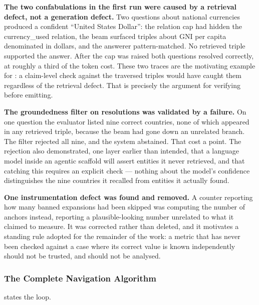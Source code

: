 \textbf{The two confabulations in the first run were caused by a retrieval
defect, not a generation defect.} Two questions about national currencies
produced a confident ``United States Dollar'': the relation cap had hidden the
\textsf{currency\_used} relation, the beam surfaced triples about GNI per capita
denominated in dollars, and the answerer pattern-matched. No retrieved triple
supported the answer. After the cap was raised both questions resolved
correctly, at roughly a third of the token cost. These two traces are the
motivating example for : a claim-level check
against the traversed triples would have caught them regardless of the retrieval
defect. That is precisely the argument for verifying before emitting.

\textbf{The groundedness filter on resolutions was validated by a failure.} On
one question the evaluator listed nine correct countries, none of which appeared
in any retrieved triple, because the beam had gone down an unrelated branch. The
filter rejected all nine, and the system abstained. That cost a point. The
rejection also demonstrated, one layer earlier than intended, that a language
model inside an agentic scaffold will assert entities it never retrieved, and
that catching this requires an explicit check --- nothing about the model's
confidence distinguishes the nine countries it recalled from entities it
actually found.

\textbf{One instrumentation defect was found and removed.} A counter reporting
how many banned expansions had been skipped was computing the number of anchors
instead, reporting a plausible-looking number unrelated to what it claimed to
measure. It was corrected rather than deleted, and it motivates a standing rule
adopted for the remainder of the work: a metric that has never been checked
against a case where its correct value is known independently should not be
trusted, and should not be analysed.
\subsubsection{The Complete Navigation
Algorithm}\label{sec:navigation-algorithm}

 states the loop.

